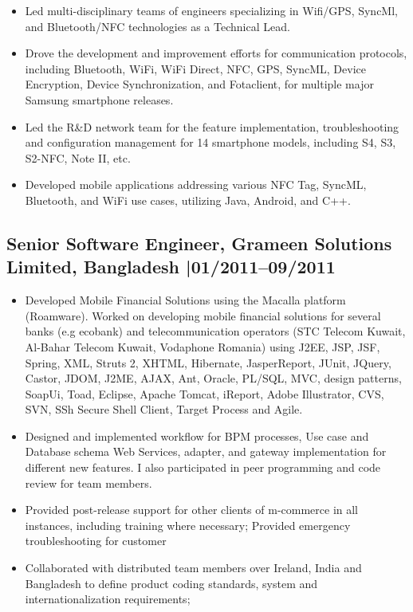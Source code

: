 \documentclass[12pt,]{scrartcl}
\begin{document}
\begin{itemize}
 \item Led multi-disciplinary teams of engineers specializing in Wifi/GPS, SyncMl, and Bluetooth/NFC technologies as a Technical Lead.
 \item Drove the development and improvement efforts for communication protocols, including Bluetooth, WiFi, WiFi Direct, NFC, GPS, SyncML, Device Encryption, Device Synchronization, and Fotaclient, for multiple major Samsung smartphone releases.
 \item Led the R\&D network team for the feature implementation, troubleshooting and configuration management for 14 smartphone models, including S4, S3, S2-NFC, Note II, etc.
 \item Developed mobile applications addressing various NFC Tag, SyncML, Bluetooth, and WiFi use cases, utilizing Java, Android, and C++.
 
\end{itemize}

\vspace{0.3cm}

\subsection*{Senior Software Engineer, Grameen Solutions Limited, Bangladesh |01/2011--09/2011}
\begin{itemize}
    \item Developed Mobile Financial Solutions using the Macalla platform (Roamware). Worked on developing mobile financial solutions for several banks (e.g ecobank) and telecommunication operators (STC Telecom Kuwait, Al-Bahar Telecom Kuwait, Vodaphone Romania) using J2EE, JSP, JSF, Spring, XML, Struts 2, XHTML, Hibernate, JasperReport, JUnit, JQuery, Castor, JDOM, J2ME, AJAX, Ant, Oracle, PL/SQL, MVC, design patterns, SoapUi, Toad, Eclipse, Apache Tomcat, iReport, Adobe Illustrator, CVS, SVN, SSh Secure Shell Client, Target Process and Agile.
   \item 	Designed and implemented workflow for BPM processes, Use case and Database schema Web Services, adapter, and gateway implementation for different new features. I also participated in peer programming and code review for team members. 
   \item 	Provided post-release support for other clients of m-commerce in all instances, including training where necessary; Provided emergency troubleshooting for customer
   \item 	 Collaborated with distributed team members over Ireland, India and Bangladesh to define product coding standards, system and internationalization requirements;


\end{itemize}
\end{document}
